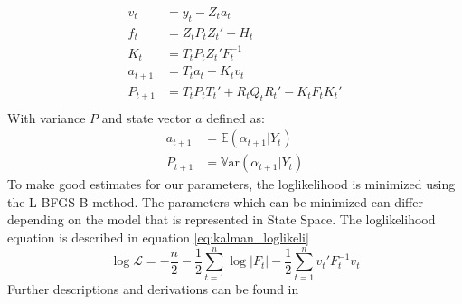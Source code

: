 \begin{equation}
\label{eq:kalman_equations}
\begin{split}
    v_t &= y_t - Z_t a_t\\
    f_t &= Z_t P_t Z_t' + H_t\\
    K_t &= T_t P_t Z_t' F_t^{-1}\\
    a_{t+1} &= T_t a_t + K_t v_t\\
    P_{t+1} &= T_t P_t T_t' + R_t Q_t R_t' - K_t F_t K_t'\\
\end{split}
\end{equation}
With variance $P$ and state vector $a$ defined as:
\begin{equation*}
\begin{split}    
    a_{t+1} &= \mathbb{E}(\alpha_{t+1}|Y_t)\\
    P_{t+1} &= \mathbb{V}\text{ar}(\alpha_{t+1}|Y_t)
\end{split}
\end{equation*}
To make good estimates for our parameters, the loglikelihood is minimized using the L-BFGS-B method. The parameters which can be minimized can differ depending on the model that is represented in State Space. The loglikelihood equation is described in equation \ref{eq:kalman_loglikeli}
\begin{equation}
    \log \mathcal{L} = -\frac{n}{2} - \frac{1}{2}\sum\limits_{t=1}^n \log|F_t| - \frac{1}{2}\sum\limits_{t=1}^n v_t' F_t^{-1} v_t
\label{eq:kalman_loglikeli}
\end{equation}
Further descriptions and derivations can be found in \cite{Durbin2012TimeModels}\\
